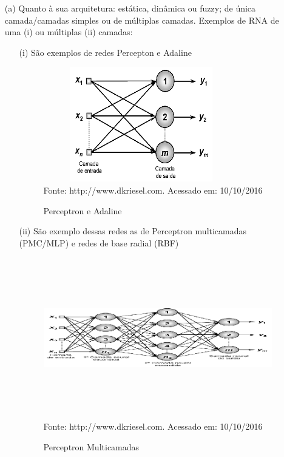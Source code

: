 \begin{itemize}
 \item [(a)] Quanto à sua arquitetura: estática, dinâmica ou fuzzy; de única camada/camadas simples ou de múltiplas camadas.
	   Exemplos de RNA de uma (i) ou múltiplas (ii) camadas:
	    \begin{enumerate}
	      \item [(i)] São exemplos de redes Percepton e Adaline
	      \begin{figure}[!ht]
		\centering
		\caption{Perceptron e Adaline}
		\vspace{1mm}
		  \includegraphics[width=85mm, height=50mm]{Figuras/Neural/pecepAdalin.png}\\
		\tiny Fonte: http://www.dkriesel.com. Acessado em: 10/10/2016
	      \end{figure}
	      \item [(ii)] São exemplo dessas redes as de Perceptron multicamadas (PMC/MLP) e redes de base radial (RBF)
	      \begin{figure}[!ht]
		\centering
		\caption{Perceptron Multicamadas}
		\vspace{1mm}
		  \includegraphics[width=110mm, height=70mm]{Figuras/Neural/MultiCamadas.png}\\
		\tiny Fonte: http://www.dkriesel.com. Acessado em: 10/10/2016
	      \end{figure}


\end{enumerate}
\end{itemize}
